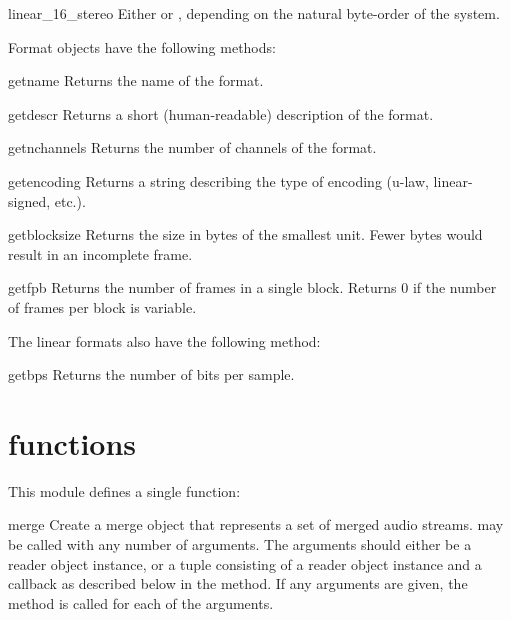 \begin{datadesc}{linear_16_stereo}
Either  or ,
depending on the natural byte-order of the system.
\end{datadesc}

Format objects have the following methods:

\begin{methoddesc}{getname}{}
Returns the name of the format.
\end{methoddesc}

\begin{methoddesc}{getdescr}{}
Returns a short (human-readable) description of the format.
\end{methoddesc}

\begin{methoddesc}{getnchannels}{}
Returns the number of channels of the format.
\end{methoddesc}

\begin{methoddesc}{getencoding}{}
Returns a string describing the type of encoding (u-law,
linear-signed, etc.).
\end{methoddesc}

\begin{methoddesc}{getblocksize}{}
Returns the size in bytes of the smallest unit.  Fewer bytes would
result in an incomplete frame.
\end{methoddesc}

\begin{methoddesc}{getfpb}{}
Returns the number of frames in a single block.  Returns 0 if the
number of frames per block is variable.
\end{methoddesc}

The linear formats also have the following method:

\begin{methoddesc}{getbps}{}
Returns the number of bits per sample.
\end{methoddesc}

\section{ functions}

This module defines a single function:

\begin{funcdesc}{merge}{}
Create a merge object that represents a set of merged audio streams.
 may be called with any number of arguments.  The
arguments should either be a reader object instance, or a tuple
consisting of a reader object instance and a callback as described
below in the  method.  If any arguments are given, the
 method is called for each of the arguments.
\end{funcdesc}

